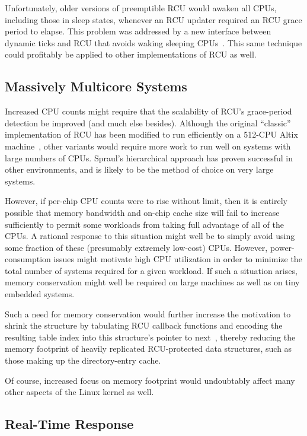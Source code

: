 Unfortunately, older versions of preemptible RCU would awaken all
CPUs, including those in sleep states, whenever an RCU updater 
required an RCU grace period to elapse.
This problem was addressed by a new interface
between dynamic ticks and RCU that avoids waking
sleeping CPUs~\cite{SteveRostedt2008dyntickRCUpatch}.
This same technique could profitably be applied to other
implementations of RCU as well.

\subsection{Massively Multicore Systems}
\label{sec:app:rcuhist:Massively Multicore Systems}

Increased CPU counts might require that the scalability
of RCU's grace-period detection be improved (and much else besides).
Although the original ``classic'' implementation of RCU has
been modified to run efficiently on a 512-CPU Altix machine~\cite{Spraul04a},
other variants would require more work to run well on systems with
large numbers of CPUs.
Spraul's hierarchical approach has proven successful in other
environments, and is likely to be the method
of choice on very large systems.

However, if per-chip CPU counts were to rise without limit,
then it is entirely possible that memory bandwidth and on-chip cache size
will fail to increase sufficiently to permit some workloads from
taking full advantage of all of the CPUs.
A rational response to this situation might well be to simply
avoid using some fraction of these (presumably extremely low-cost) CPUs.
However, power-consumption issues might motivate
high CPU utilization in order to minimize the total number of systems
required for a given workload.
If such a situation arises,
memory conservation might well be required on large machines
as well as on tiny embedded systems.

Such a need for memory conservation would further increase the motivation
to shrink the 
structure by tabulating RCU callback functions and encoding the
resulting table index into this structure's pointer to
next~\cite{PaulEMcKenney2006b}, thereby reducing the memory footprint
of heavily replicated RCU-protected data structures, such as
those making up the directory-entry cache.

Of course, increased focus on memory footprint would undoubtably affect
many other aspects of the Linux kernel as well.

\subsection{Real-Time Response}
\label{sec:app:rcuhist:Real-Time Response}

